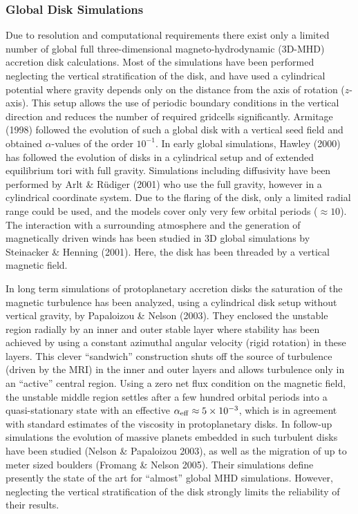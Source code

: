 \subsubsection{Global Disk Simulations}
%
Due to resolution and computational requirements there exist only a limited
number of global full three-dimensional magneto-hydrodynamic (3D-MHD) accretion
disk calculations.  Most of the simulations have been performed neglecting
the vertical stratification of the disk, and have used a cylindrical
potential where gravity depends only on the distance from the axis of
rotation ($z$-axis).  This setup allows the use of periodic boundary
conditions in the vertical direction and reduces the number of required
gridcells significantly.  Armitage (1998) followed the evolution of such a
global disk with a vertical seed field and obtained $\alpha$-values of the
order $10^{-1}$.  In early global simulations, Hawley (2000) has followed the
evolution of disks in a cylindrical setup and of extended equilibrium tori
with full gravity.  Simulations including diffusivity have been performed by
Arlt \& R\"udiger (2001) who use the full gravity, however in a cylindrical
coordinate system.  Due to the flaring of the disk, only a limited radial
range could be used, and the models cover only very few orbital periods
($\approx 10$).  The interaction with a surrounding atmosphere and the
generation of magnetically driven winds has been studied in 3D global
simulations by Steinacker \& Henning (2001).  Here, the disk has been
threaded by a vertical magnetic field.

In long term simulations of protoplanetary accretion disks the saturation of
the magnetic turbulence has been analyzed, using a cylindrical disk setup
without vertical gravity, by Papaloizou \& Nelson (2003).  They enclosed the
unstable region radially by an inner and outer stable layer where stability
has been achieved by using a constant azimuthal angular velocity (rigid
rotation) in these layers. This clever ``sandwich'' construction shuts off
the source of turbulence (driven by the MRI) in the inner and outer layers
and allows turbulence only in an ``active'' central region.  Using a zero
net flux condition on the magnetic field, the unstable middle region settles
after a few hundred orbital periods into a quasi-stationary state with an
effective $\alpha_{\rm eff} \approx 5 \times 10^{-3}$, which is in agreement
with standard estimates of the viscosity in protoplanetary disks.  In
follow-up simulations the evolution of massive planets embedded in such
turbulent disks have been studied (Nelson \& Papaloizou 2003), as well as
the migration of up to meter sized boulders (Fromang \& Nelson 2005). Their
simulations define presently the state of the art for ``almost'' global MHD
simulations. However, neglecting the vertical stratification of the disk
strongly limits the reliability of their results.
%
